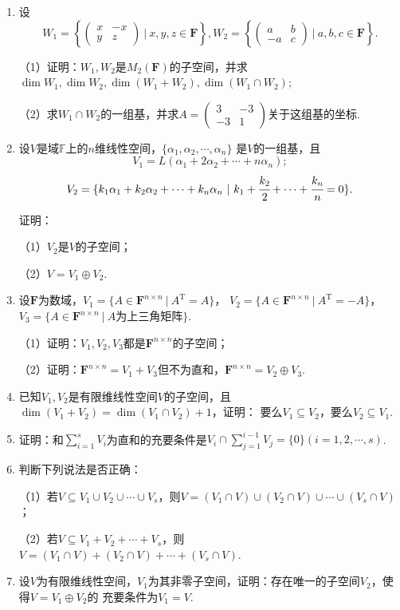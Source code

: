 \begin{enumerate}
	\item 设$$W_1=\left\{\begin{pmatrix}
		x & -x \\ y & z
	\end{pmatrix}\ \bigg|\ x,y,z\in \mathbf{F} \right\},W_2=\left\{\begin{pmatrix}
		a & b \\ -a & c
	\end{pmatrix}\ \bigg|\ a,b,c\in \mathbf{F} \right\}.$$

	（1）证明：$W_1,W_2$是$M_2(\mathbf{F})$的子空间，并求$\dim W_1,\dim W_2,\dim(W_1+W_2),\dim(W_1\cap W_2)$;

	（2）求$W_1\cap W_2$的一组基，并求$A=\begin{pmatrix}
		3 & -3 \\ -3 & 1
	\end{pmatrix}$关于这组基的坐标.
	\item 设$V$是域$\mathbb{F}$上的$n$维线性空间，$\{\alpha_1,\alpha_2,\cdots,\alpha_n\}$
	是$V$的一组基，且
	$$V_1=L(\alpha_1+2\alpha_2+\cdots+n\alpha_n);$$
	$$V_2=\{k_1\alpha_1+k_2\alpha_2+\cdots+k_n\alpha_n\ |\ k_1+\cfrac{k_2}{2}+\cdots+\cfrac{k_n}{n}=0\}.$$
	
	证明：

	（1）$V_2$是$V$的子空间；

	（2）$V=V_1\oplus V_2$.
	\item 设$\mathbf{F}$为数域，$V_1=\{A\in\mathbf{F}^{n\times n}\ |\ A^\mathrm{T}=A\}$，
	$V_2=\{A\in\mathbf{F}^{n\times n}\ |\ A^\mathrm{T}=-A\}$，$V_3=\{A\in\mathbf{F}^{n\times n}\ |\ A$为上三角矩阵$\}$.

	（1）证明：$V_1,V_2,V_3$都是$\mathbf{F}^{n\times n}$的子空间；

	（2）证明：$\mathbf{F}^{n\times n}=V_1+V_3$但不为直和，$\mathbf{F}^{n\times n}=V_2\oplus V_3$.
	\item 已知$V_1,V_2$是有限维线性空间$V$的子空间，且$\dim(V_1+V_2)=\dim(V_1 \cap V_2)+1$，证明：
	要么$V_1 \subseteq V_2$，要么$V_2 \subseteq V_1$.
	\item 证明：和$\sum\limits_{i=1}^{s}V_i$为直和的充要条件是$V_i \cap \sum\limits_{j=1}^{i-1}V_j=\{0\}(i=1,2,\cdots,s)$.
	\item 判断下列说法是否正确：
	
	（1）若$V \subseteq V_1 \cup V_2 \cup \cdots \cup V_s$，则$V=(V_1 \cap V)\cup(V_2 \cap V)\cup\cdots\cup(V_s \cap V)$；

	（2）若$V \subseteq V_1+V_2+\cdots +V_s$，则$V=(V_1 \cap V)+(V_2 \cap V)+\cdots+(V_s \cap V)$.
	\item 设$V$为有限维线性空间，$V_1$为其非零子空间，证明：存在唯一的子空间$V_2$，使得$V=V_1\oplus V_2$的
	充要条件为$V_1=V$.
\end{enumerate}
